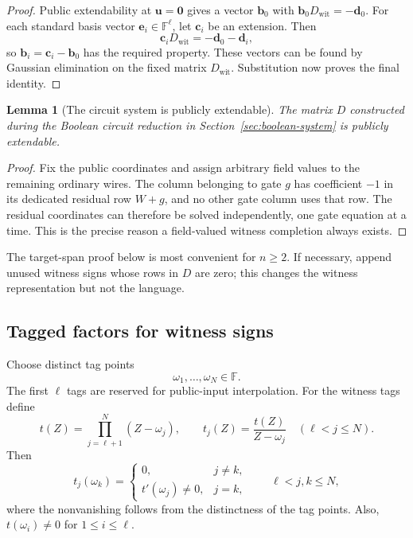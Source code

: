 \documentclass[11pt]{article}
\newtheorem{lemma}[theorem]{Lemma}
\theoremstyle{definition}
\newcommand{\F}{\mathbb F}
\begin{document}
\begin{proof}
Public extendability at $\mathbf u=\mathbf 0$ gives a vector $\mathbf b_0$
with $\mathbf b_0D_{\mathrm{wit}}=-\mathbf d_0$.  For each standard basis
vector $\mathbf e_i\in\F^\ell$, let $\mathbf c_i$ be an extension.  Then
\[
  \mathbf c_iD_{\mathrm{wit}}=-\mathbf d_0-\mathbf d_i,
\]
so $\mathbf b_i=\mathbf c_i-\mathbf b_0$ has the required property.  These
vectors can be found by Gaussian elimination on the fixed matrix
$D_{\mathrm{wit}}$.  Substitution now proves the final identity.
\end{proof}

\begin{lemma}[The circuit system is publicly extendable]
\label{lem:field-extension}
The matrix $D$ constructed during the Boolean circuit reduction in Section~\ref{sec:boolean-system} is publicly extendable.
\end{lemma}

\begin{proof}
Fix the public coordinates and assign arbitrary field values to the remaining
ordinary wires.  The column belonging to gate $g$ has coefficient $-1$ in its
dedicated residual row $W+g$, and no other gate column uses that row.  The
residual coordinates can therefore be solved independently, one gate equation
at a time.  This is the precise reason a field-valued witness completion always
exists.
\end{proof}

The target-span proof below is most convenient for $n\ge2$.  If necessary,
append unused witness signs whose rows in $D$ are zero; this changes the witness
representation but not the language.

\subsection{Tagged factors for witness signs}

Choose distinct tag points
\[
  \omega_1,\ldots,\omega_N\in\F.
\]
The first $\ell$ tags are reserved for public-input interpolation.  For the
witness tags define
\begin{equation}
  t(Z)=\prod_{j=\ell+1}^{N}(Z-\omega_j),
  \qquad
  t_j(Z)=\frac{t(Z)}{Z-\omega_j}
  \quad(\ell<j\le N).
  \label{eq:fsp-witness-tags}
\end{equation}
Then
\begin{equation}
  t_j(\omega_k)=
  \begin{cases}
    0,&j\ne k,\\
    t'(\omega_j)\neq 0,&j=k,
  \end{cases}
  \qquad \ell<j,k\le N,
  \label{eq:fsp-tag-evaluation}
\end{equation}
where the nonvanishing follows from the distinctness of the tag points.  Also,
$t(\omega_i)\ne0$ for $1\le i\le\ell$.
\end{document}
